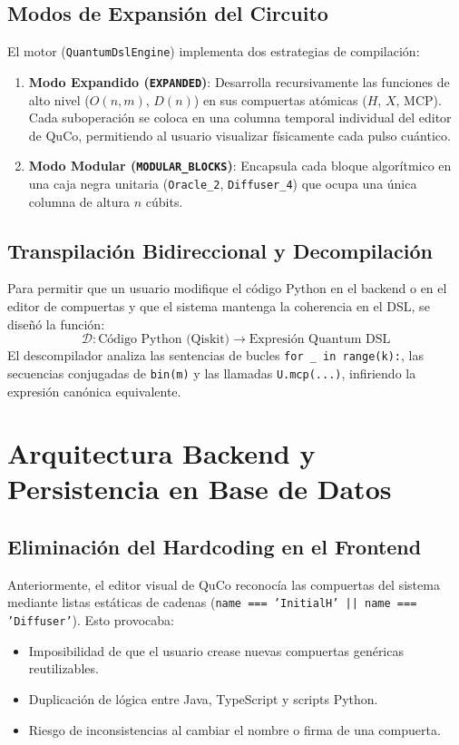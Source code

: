 \documentclass[11pt,a4paper]{article}
\begin{document}
\subsection{Modos de Expansión del Circuito}
El motor (\texttt{QuantumDslEngine}) implementa dos estrategias de compilación:
\begin{enumerate}
    \item \textbf{Modo Expandido (\texttt{EXPANDED})}: Desarrolla recursivamente las funciones de alto nivel ($O(n, m)$, $D(n)$) en sus compuertas atómicas ($H$, $X$, $\text{MCP}$). Cada suboperación se coloca en una columna temporal individual del editor de QuCo, permitiendo al usuario visualizar físicamente cada pulso cuántico.
    \item \textbf{Modo Modular (\texttt{MODULAR\_BLOCKS})}: Encapsula cada bloque algorítmico en una caja negra unitaria (\texttt{Oracle\_2}, \texttt{Diffuser\_4}) que ocupa una única columna de altura $n$ cúbits.
\end{enumerate}

\subsection{Transpilación Bidireccional y Decompilación}
Para permitir que un usuario modifique el código Python en el backend o en el editor de compuertas y que el sistema mantenga la coherencia en el DSL, se diseñó la función:
\begin{equation}
    \mathcal{D}: \text{Código Python (Qiskit)} \longrightarrow \text{Expresión Quantum DSL}
\end{equation}
El descompilador analiza las sentencias de bucles \texttt{for \_ in range(k):}, las secuencias conjugadas de \texttt{bin(m)} y las llamadas \texttt{U.mcp(...)}, infiriendo la expresión canónica equivalente.

\section{Arquitectura Backend y Persistencia en Base de Datos}

\subsection{Eliminación del Hardcoding en el Frontend}
Anteriormente, el editor visual de QuCo reconocía las compuertas del sistema mediante listas estáticas de cadenas (\texttt{name === 'InitialH' || name === 'Diffuser'}). Esto provocaba:
\begin{itemize}
    \item Imposibilidad de que el usuario crease nuevas compuertas genéricas reutilizables.
    \item Duplicación de lógica entre Java, TypeScript y scripts Python.
    \item Riesgo de inconsistencias al cambiar el nombre o firma de una compuerta.
\end{itemize}
\end{document}
